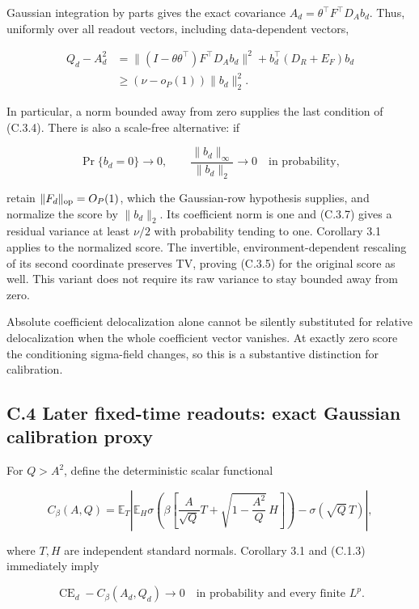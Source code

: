 \documentclass[
  11pt,
  a4paper,
]{article}
\begin{document}
Gaussian integration by parts gives the exact covariance
\(A_d=\theta^\top F^\top D_A b_d\). Thus, uniformly over all readout
vectors, including data-dependent vectors,

\[
\begin{aligned}
Q_d-A_d^2
 &=\|(I-\theta\theta^\top)F^\top D_A b_d\|^2
   +b_d^\top(D_R+E_F)b_d\\
 &\ge (\nu-o_P(1))\|b_d\|_2^2.
\end{aligned}
\tag{C.3.7}
\]

In particular, a norm bounded away from zero supplies the last condition
of (C.3.4). There is also a scale-free alternative: if

\[
\Pr\{b_d=0\}\to0,\qquad
\frac{\|b_d\|_\infty}{\|b_d\|_2}\to0
\quad\text{in probability},
\tag{C.3.8}
\]

retain \(\|F_d\|_{\rm op}=O_P(1)\), which the Gaussian-row hypothesis
supplies, and normalize the score by \(\|b_d\|_2\). Its coefficient norm
is one and (C.3.7) gives a residual variance at least \(\nu/2\) with
probability tending to one. Corollary 3.1 applies to the normalized
score. The invertible, environment-dependent rescaling of its second
coordinate preserves TV, proving (C.3.5) for the original score as well.
This variant does not require its raw variance to stay bounded away from
zero.

Absolute coefficient delocalization alone cannot be silently substituted
for relative delocalization when the whole coefficient vector vanishes.
At exactly zero score the conditioning sigma-field changes, so this is a
substantive distinction for calibration.

\hypertarget{c.4-later-fixed-time-readouts-exact-gaussian-calibration-proxy}{%
\subsection{C.4 Later fixed-time readouts: exact Gaussian calibration
proxy}\label{c.4-later-fixed-time-readouts-exact-gaussian-calibration-proxy}}

For \(Q>A^2\), define the deterministic scalar functional

\[
C_\beta(A,Q)=\mathbb E_T\left|
 \mathbb E_H\sigma\!\left(\beta\left[
 \frac A{\sqrt Q}T+\sqrt{1-\frac{A^2}Q}\,H\right]\right)
 -\sigma(\sqrt Q\,T)\right|,
\tag{C.4.1}
\]

where \(T,H\) are independent standard normals. Corollary 3.1 and
(C.1.3) immediately imply

\[
\operatorname{CE}_d-C_\beta(A_d,Q_d)\longrightarrow0
\quad\text{in probability and every finite }L^p.
\tag{C.4.2}
\]
\end{document}
